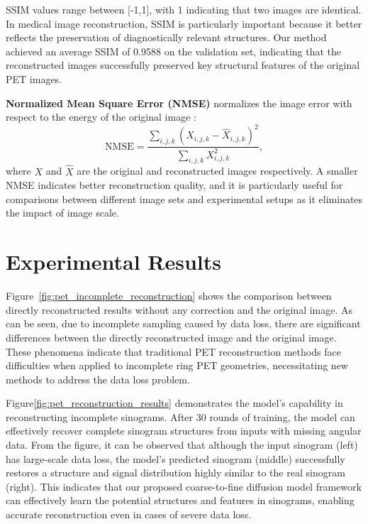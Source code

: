 \documentclass[
reprint,
superscriptaddress,
nofootinbib,
amsmath,amssymb,
aps,
prd,
]{revtex4-2}
\begin{document}
SSIM values range between [-1,1], with 1 indicating that two images are identical. In medical image reconstruction, SSIM is particularly important because it better reflects the preservation of diagnostically relevant structures. Our method achieved an average SSIM of 0.9588 on the validation set, indicating that the reconstructed images successfully preserved key structural features of the original PET images.

\textbf{Normalized Mean Square Error (NMSE)} normalizes the image error with respect to the energy of the original image \cite{Higashiyama2024NMSE}:
\begin{equation}
\text{NMSE} = \frac{\sum_{i,j,k}(X_{i,j,k} - \hat{X}_{i,j,k})^2}{\sum_{i,j,k}X_{i,j,k}^2},
\end{equation}
where $X$ and $\hat{X}$ are the original and reconstructed images respectively. A smaller NMSE indicates better reconstruction quality, and it is particularly useful for comparisons between different image sets and experimental setups as it eliminates the impact of image scale.




\section{Experimental Results}

\label{chap:results}

Figure~\ref{fig:pet_incomplete_reconstruction} shows the comparison between directly reconstructed results without any correction and the original image. As can be seen, due to incomplete sampling caused by data loss, there are significant differences between the directly reconstructed image and the original image. These phenomena indicate that traditional PET reconstruction methods face difficulties when applied to incomplete ring PET geometries, necessitating new methods to address the data loss problem.

Figure\ref{fig:pet_reconstruction_results} demonstrates the model's capability in reconstructing incomplete sinograms. After 30 rounds of training, the model can effectively recover complete sinogram structures from inputs with missing angular data. From the figure, it can be observed that although the input sinogram (left) has large-scale data loss, the model's predicted sinogram (middle) successfully restores a structure and signal distribution highly similar to the real sinogram (right). This indicates that our proposed coarse-to-fine diffusion model framework can effectively learn the potential structures and features in sinograms, enabling accurate reconstruction even in cases of severe data loss.
\end{document}
